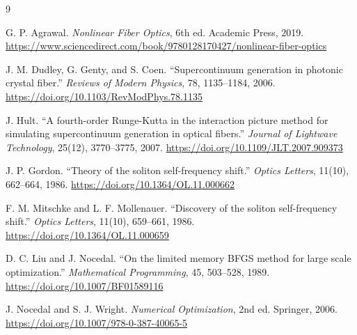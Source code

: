 \documentclass[11pt]{article}
\begin{document}
\begin{thebibliography}{9}

G. P. Agrawal.
\textit{Nonlinear Fiber Optics}, 6th ed.
Academic Press, 2019.
\url{https://www.sciencedirect.com/book/9780128170427/nonlinear-fiber-optics}

J. M. Dudley, G. Genty, and S. Coen.
``Supercontinuum generation in photonic crystal fiber.''
\textit{Reviews of Modern Physics}, 78, 1135--1184, 2006.
\url{https://doi.org/10.1103/RevModPhys.78.1135}

J. Hult.
``A fourth-order Runge-Kutta in the interaction picture method for simulating
supercontinuum generation in optical fibers.''
\textit{Journal of Lightwave Technology}, 25(12), 3770--3775, 2007.
\url{https://doi.org/10.1109/JLT.2007.909373}

J. P. Gordon.
``Theory of the soliton self-frequency shift.''
\textit{Optics Letters}, 11(10), 662--664, 1986.
\url{https://doi.org/10.1364/OL.11.000662}

F. M. Mitschke and L. F. Mollenauer.
``Discovery of the soliton self-frequency shift.''
\textit{Optics Letters}, 11(10), 659--661, 1986.
\url{https://doi.org/10.1364/OL.11.000659}

D. C. Liu and J. Nocedal.
``On the limited memory BFGS method for large scale optimization.''
\textit{Mathematical Programming}, 45, 503--528, 1989.
\url{https://doi.org/10.1007/BF01589116}

J. Nocedal and S. J. Wright.
\textit{Numerical Optimization}, 2nd ed.
Springer, 2006.
\url{https://doi.org/10.1007/978-0-387-40065-5}

\end{thebibliography}
\end{document}
